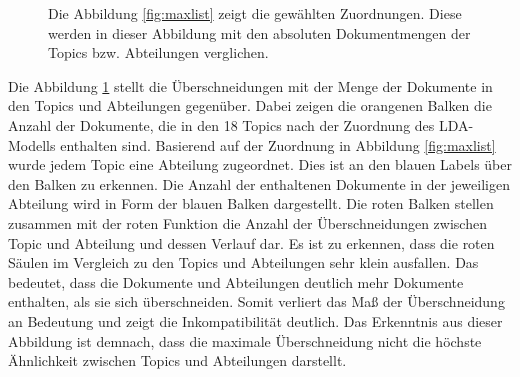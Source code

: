\documentclass[german,version-2020-11]{uzl-thesis}
\begin{document}
\begin{figure}[H]
\begin{center}

\end{center}
\caption{Die Abbildung \ref{fig:maxlist} zeigt die gewählten Zuordnungen. Diese werden in dieser Abbildung mit den absoluten Dokumentmengen der Topics bzw. Abteilungen verglichen.}
\label{fig:comp}
\end{figure}

Die Abbildung \ref{fig:comp} stellt die Überschneidungen mit der Menge der Dokumente in den Topics und Abteilungen gegenüber. Dabei zeigen die orangenen Balken die Anzahl der Dokumente, die in den 18 Topics nach der Zuordnung des LDA-Modells enthalten sind. Basierend auf der Zuordnung in Abbildung \ref{fig:maxlist} wurde jedem Topic eine Abteilung zugeordnet. Dies ist an den blauen Labels über den Balken zu erkennen. Die Anzahl der enthaltenen Dokumente in der jeweiligen Abteilung wird in Form der blauen Balken dargestellt. Die roten Balken stellen zusammen mit der roten Funktion die Anzahl der Überschneidungen zwischen Topic und Abteilung und dessen Verlauf dar. Es ist zu erkennen, dass die roten Säulen im Vergleich zu den Topics und Abteilungen sehr klein ausfallen. Das bedeutet, dass die Dokumente und Abteilungen deutlich mehr Dokumente enthalten, als sie sich überschneiden. Somit verliert das Maß der Überschneidung an Bedeutung und zeigt die Inkompatibilität deutlich. Das Erkenntnis aus dieser Abbildung ist demnach, dass die maximale Überschneidung nicht die höchste Ähnlichkeit zwischen Topics und Abteilungen darstellt. \\
\end{document}
